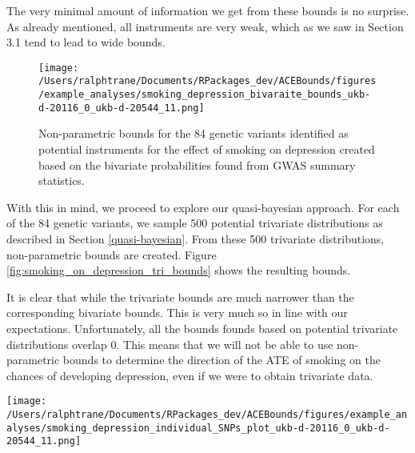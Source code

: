 \documentclass[
]{article}
\theoremstyle{plain}
\begin{document}
The very minimal amount of information we get from these bounds is no surprise. As already mentioned, all instruments are very weak, which as we saw in Section 3.1 tend to lead to wide bounds.

\begin{figure}[H]
  \texttt{[image: /Users/ralphtrane/Documents/RPackages\_dev/ACEBounds/figures/example\_analyses/smoking\_depression\_bivaraite\_bounds\_ukb-d-20116\_0\_ukb-d-20544\_11.png]}
  \caption{Non-parametric bounds for the 84 genetic variants identified as potential instruments for the effect of smoking on depression created based on the bivariate probabilities found from GWAS summary statistics.}
  \label{fig:smoking_on_depression_ind_bounds}
\end{figure}

With this in mind, we proceed to explore our quasi-bayesian approach. For each of the 84 genetic variants, we sample 500 potential trivariate distributions as described in Section \ref{quasi-bayesian}. From these 500 trivariate distributions, non-parametric bounds are created. Figure \ref{fig:smoking_on_depression_tri_bounds} shows the resulting bounds.

It is clear that while the trivariate bounds are much narrower than the corresponding bivariate bounds. This is very much so in line with our expectations. Unfortunately, all the bounds founds based on potential trivariate distributions overlap 0. This means that we will not be able to use non-parametric bounds to determine the direction of the ATE of smoking on the chances of developing depression, even if we were to obtain trivariate data.

\clearpage

\begin{sidewaysfigure}
  \texttt{[image: /Users/ralphtrane/Documents/RPackages\_dev/ACEBounds/figures/example\_analyses/smoking\_depression\_individual\_SNPs\_plot\_ukb-d-20116\_0\_ukb-d-20544\_11.png]}
    \caption{500 bounds for each of the 84 SNPs. Each bound is based on a set of values for the trivariate distribution randomyl sampled. Bounds are color coded to show if they overlap 0 (grey) or do not (red). All bounds overlap 0.}
    \label{fig:smoking_on_depression_tri_bounds}
\end{sidewaysfigure}

\clearpage
\end{document}
